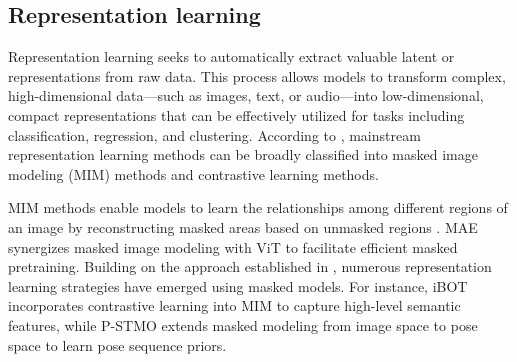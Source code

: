 \subsection{Representation learning}

Representation learning seeks to automatically extract valuable latent or representations from raw data. This process allows models to transform complex, high-dimensional data---such as images, text, or audio---into low-dimensional, compact representations that can be effectively utilized for tasks including classification, regression, and clustering. According to \cite{li_masked_2024}, mainstream representation learning methods can be broadly classified into masked image modeling (MIM) methods and contrastive learning methods.

MIM methods enable models to learn the relationships among different regions of an image by reconstructing masked areas based on unmasked regions \cite{he_masked_2021,zhou_ibot_2022,xie2021simmim,Xie_2023_CVPR,Chang_2022_CVPR,Wang_2023_CVPR}. MAE\cite{he_masked_2021} synergizes masked image modeling with ViT \cite{vit_dosovitskiy2021an} to facilitate efficient masked pretraining. Building on the approach established in \cite{he_masked_2021}, numerous representation learning strategies have emerged using masked models. For instance, iBOT \cite{zhou_ibot_2022} incorporates contrastive learning into MIM to capture high-level semantic features, while P-STMO \cite{avidan_p-stmo_2022} extends masked modeling from image space to pose space to learn pose sequence priors.

